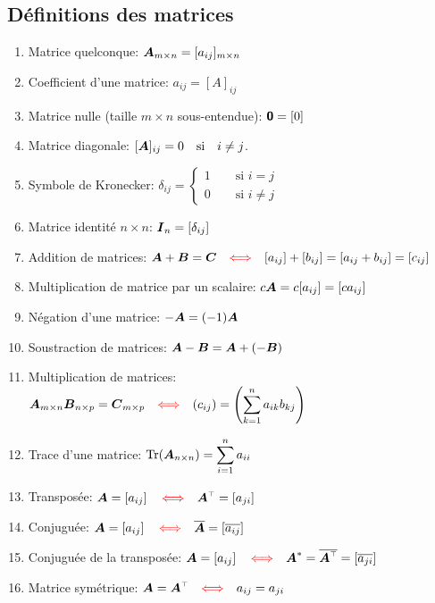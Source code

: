 \begin{adjmulticols}{1}{0in}{-2in}
\section{Définitions des matrices}

\begin{enumerate}
\item Matrice quelconque: $\boldsymbol{A}_{m\times n} = [a_{ij}]_{m\times n}$
\item Coefficient d'une matrice: $a_{ij} = [A]_{ij}$
\item Matrice nulle (taille $m\times n$ sous-entendue): $\mbox{\textsf{\textbf{{0}}}} = [0]$
\item Matrice diagonale: $[\boldsymbol{A}]_{ij} = 0 \quad\mbox{si}\quad i\neq j$.
\item Symbole de Kronecker: $\displaystyle \delta_{ij} = \left\{
\begin{matrix}
1 \qquad\mbox{si $i=j$} \\
0 \qquad\mbox{si $i\neq j$}
\end{matrix}
\right. $
\item Matrice identité $n\times n$: $\boldsymbol{I}_n = [\delta_{ij}]$
\item Addition de matrices: $\boldsymbol{A}+\boldsymbol{B} = \boldsymbol{C} \quad {\color{red}\Longleftrightarrow} \quad [a_{ij}] + [b_{ij}] = [a_{ij} + b_{ij}] = [c_{ij}]$
\item Multiplication de matrice par un scalaire: $c\boldsymbol{A} = c[a_{ij}] = [ca_{ij}]$
\item Négation d'une matrice: $-\boldsymbol{A} = (-1)\boldsymbol{A}$ 
\item Soustraction de matrices: $\boldsymbol{A} - \boldsymbol{B} = \boldsymbol{A} + (-\boldsymbol{B})$
\item Multiplication de matrices: $\boldsymbol{A}_{m\times n}\boldsymbol{B}_{n\times p} = \boldsymbol{C}_{m\times p} \quad {\color{red}\Longleftrightarrow} \quad (c_{ij}) = \displaystyle\left(\sum_{k=1}^{n} a_{ik} b_{kj}\right)$
\item Trace d'une matrice: $\displaystyle\operatorname{Tr}(\boldsymbol{A}_{n\times n}) = \sum_{i=1}^n a_{ii}$
\item Transposée: $\matA = \left[a_{ij}\right] \quad{\color{red}\Longleftrightarrow}\quad  \transp{\matA} = [a_{ji}]$
\item Conjuguée: $\boldsymbol{A} = \left[a_{ij}\right] \quad{\color{red}\Longleftrightarrow}\quad  \overline{\boldsymbol{A}} = [\overline{a_{ij}}]$
\item Conjuguée de la transposée: $\matA = \left[a_{ij}\right] \quad{\color{red}\Longleftrightarrow}\quad  \matA^* = \overline{\transp{\matA}} = [\overline{a_{ji}}]$
\item Matrice symétrique: $\matA = \transp{\matA} \quad{\color{red}\Longleftrightarrow}\quad a_{ij} = a_{ji}$

\end{enumerate}
\end{adjmulticols}
